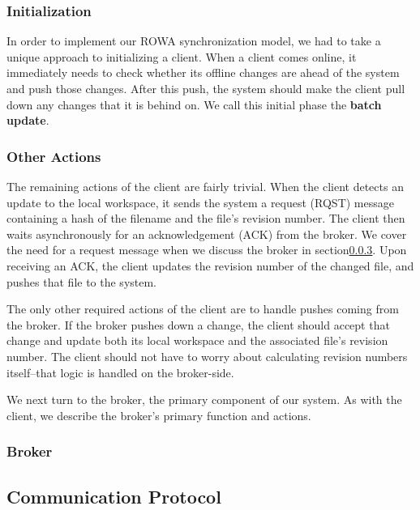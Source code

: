 \subsubsection{Initialization}
In order to implement our ROWA synchronization model,
we had to take a unique approach to initializing a client.
When a client comes online,
it immediately needs to check whether its offline changes
are ahead of the system and push those changes.
After this push, the system should make the client
pull down any changes that it is behind on.
We call this initial phase the \textbf{batch update}.

\subsubsection{Other Actions}
The remaining actions of the client are fairly trivial.
When the client detects an update to the local workspace,
it sends the system a request (RQST) message containing a hash
of the filename and the file's revision number.
The client then waits asynchronously for an acknowledgement
(ACK) from the broker.
We cover the need for a request message when we discuss the broker
in section\ref{broker}.
Upon receiving an ACK, the client updates the revision
number of the changed file,
and pushes that file to the system.

The only other required actions of the client are to handle
pushes coming from the broker.
If the broker pushes down a change,
the client should accept that change and update both its
local workspace and the associated file's revision number.
The client should not have to worry about calculating
revision numbers itself--that logic is handled on the broker-side.

We next turn to the broker,
the primary component of our system.
As with the client, we describe the broker's primary
function and actions.

\subsubsection{Broker}
\label{broker}

\subsection{Communication Protocol}

